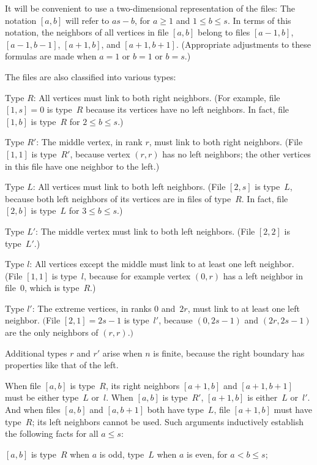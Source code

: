 It will be convenient to use a two-dimensional representation of the files: The
notation $[a,b]$ will refer to $as-b$, for $a\geq 1$ and $1\leq b\leq s$. In
terms of this notation, the neighbors of all vertices in file $[a,b]$ belong to
files $[a-1,b]$, $[a-1,b-1]$, $[a+1,b]$, and $[a+1,b+1]$. (Appropriate
adjustments to these formulas are made when $a=1$ or $b=1$ or $b=s$.)

The files are also classified into various types:

\medskip
\bib
Type $R$: All vertices must link to both right neighbors. (For example, file
$[1,s]=0$ is type~$R$ because its vertices have no left neighbors. In fact,
file $[1,b]$ is type~$R$ for $2\leq b\leq s$.)

\bib
Type $R'$: The middle vertex, in rank $r$, must link to both right neighbors.
(File $[1,1]$ is type~$R'$, because vertex $(r,r)$ has no left neighbors; the
other vertices in this file have one  neighbor to the left.)

\bib
Type $L$: All vertices must link to both left neighbors. (File $[2,s]$ is
type~$L$, because both left neighbors of its vertices are in files of type~$R$.
In fact, file $[2,b]$ is type~$L$ for $3\leq b\leq s$.)

\bib
Type $L'$: The middle vertex must link to both left neighbors. (File $[2,2]$ is
type~$L'$.)

\bib
Type $l$: All vertices except the middle must link to at least one left
neighbor. (File $[1,1]$ is type~$l$, because for example vertex $(0,r)$ has a
left neighbor in file~0, which is type~$R$.)

\bib
Type $l'$: The extreme vertices, in ranks 0 and~$2r$, must link to at least one
left neighbor. $\bigl($File $[2,1]=2s-1$ is type~$l'$, because $(0,2s-1)$ and
$(2r,2s-1)$ are the only neighbors of $(r,r)$.$\bigr)$

\medskip
Additional types $r$ and $r'$ arise when $n$ is finite, because the right
boundary has properties like that of the left.

When file $[a,b]$ is type~$R$, its right neighbors $[a+1,b]$ and $[a+1,b+1]$
must be either type~$L$ or~$l$. When $[a,b]$ is type~$R'$, $[a+1,b]$ is
either~$L$ or~$l'$. And when files $[a,b]$ and $[a,b+1]$ both have type~$L$,
file $[a+1,b]$ must have type~$R$; its left neighbors cannot be used. Such
arguments inductively establish the following facts for all $a\leq s$:

\medskip
\biba
$[a,b]$ is type~$R$ when $a$ is odd, type~$L$ when $a$ is even, for $a<b\leq
s$; 

